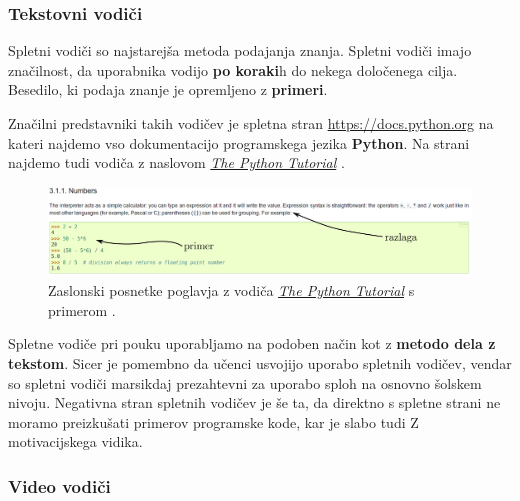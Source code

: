 
\subsubsection{Tekstovni vodiči}

Spletni vodiči so najstarejša metoda podajanja znanja. Spletni vodiči
imajo značilnost, da uporabnika vodijo \textbf{po koraki}h do nekega
določenega cilja. Besedilo, ki podaja znanje je opremljeno z
\textbf{primeri}. \cite{wiki:tutorials}

Značilni predstavniki takih vodičev je spletna stran
\url{https://docs.python.org} na kateri najdemo vso dokumentacijo
programskega jezika \textbf{Python}. Na strani najdemo tudi vodiča z
naslovom \emph{\href{https://docs.python.org/3/tutorial/index.html}{The
  Python Tutorial}} \cite{web:TPythonTut}.

\begin{figure}[h!]
  \includegraphics [width=1\linewidth, keepaspectratio =
  1] {./images/sc_web/tPyTut_01.png}
      \caption{Zaslonski posnetke poglavja z vodiča
      \emph{\href{https://docs.python.org/3/tutorial/index.html}{The
          Python Tutorial}} s primerom \cite{web:TPythonTut}.}
    \label{fig:scr:web:tPyTut}
\end{figure}

Spletne vodiče pri pouku uporabljamo na podoben način kot z 
\textbf{metodo dela z tekstom}. Sicer je pomembno da učenci usvojijo
uporabo spletnih vodičev, vendar so spletni vodiči marsikdaj
prezahtevni za uporabo sploh na osnovno šolskem nivoju. Negativna
stran spletnih vodičev je še ta, da direktno s spletne strani ne
moramo preizkušati primerov programske kode, kar je slabo tudi Z
motivacijskega vidika.

\subsubsection{Video vodiči}
\label{sec:video_vodici}

